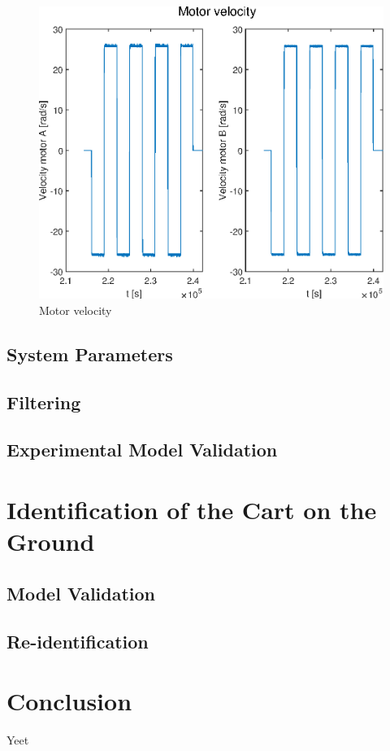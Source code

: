 \documentclass[a4paper,kul]{kulakarticle} %
\begin{document}
\begin{figure}[htp!]
	\centering
	\includegraphics[width=.7\linewidth]{motor_velocity.eps}
	\caption{Motor velocity}
	\label{fig:motor_velocity}
\end{figure}	


\subsection{System Parameters}


\subsection{Filtering}


\subsection{Experimental Model Validation}


\section{Identification of the Cart on the Ground}


\subsection{Model Validation}


\subsection{Re-identification}












\section*{Conclusion}
Yeet
\end{document}
